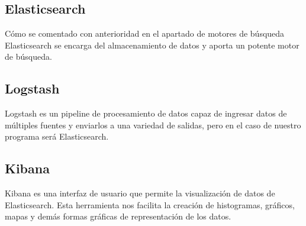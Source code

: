 \subsection{Elasticsearch}
Cómo se comentado con anterioridad en el apartado de motores de búsqueda Elasticsearch se encarga del almacenamiento de datos y aporta un potente motor de búsqueda.

\subsection{Logstash}
Logstash es un pipeline de procesamiento de datos capaz de ingresar datos de múltiples fuentes y enviarlos a una variedad de salidas, pero en el caso de nuestro programa será Elasticsearch.

\subsection{Kibana}
Kibana es una interfaz de usuario que permite la visualización de datos de Elasticsearch. Esta herramienta nos facilita la creación de histogramas, gráficos, mapas y demás formas gráficas de representación de los datos.